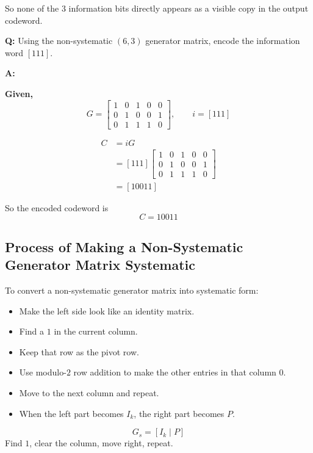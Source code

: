 \documentclass[11pt,a4paper]{book}
\newenvironment{infobox}[1][Information]{%
    \begin{tcolorbox}[
        enhanced,
        breakable,
        colback=mintgreen!10,
        colframe=mintgreen!200,
        title=#1,
        fonttitle=\bfseries,
        sharp corners,
        boxrule=0.8pt,
        left=8pt,
        right=8pt,
        top=6pt,
        bottom=6pt
    ]
}{\end{tcolorbox}}
\newcounter{qna}[chapter]
\renewcommand{\theqna}{\thechapter.\arabic{qna}}
\newenvironment{questionanswerbox}[1][Example]{%
    \refstepcounter{qna}
    \begin{tcolorbox}[
        enhanced,
        breakable,
        colback=softlavender!10,
        colframe=softlavender!200,
        title={#1~\theqna},
        fonttitle=\bfseries,
        coltitle=white,
        colbacktitle=softlavender!200,
        sharp corners,
        boxrule=1pt,
        left=8pt,
        right=8pt,
        top=6pt,
        bottom=6pt
    ]
}{\end{tcolorbox}}
\begin{document}
So none of the \(3\) information bits directly appears as a visible copy in the output codeword.

\begin{questionanswerbox}[Non-Systematic Generator Matrix Encoding Example]
\textbf{Q:} Using the non-systematic \((6,3)\) generator matrix, encode the information word \([111]\).

\textbf{A:}

\textbf{Given,}
\[
G=
\begin{bmatrix}
1&0&1&0&0\\
0&1&0&0&1\\
0&1&1&1&0
\end{bmatrix},
\qquad
i=[111]
\]

\begin{align*}
C &= iG\\
  &= [111]
\begin{bmatrix}
1&0&1&0&0\\
0&1&0&0&1\\
0&1&1&1&0
\end{bmatrix}\\
  &= [10011]
\end{align*}

So the encoded codeword is
\[
C=10011
\]
\end{questionanswerbox}

\subsection{Process of Making a Non-Systematic Generator Matrix Systematic}

\begin{infobox}[Short Process]
To convert a non-systematic generator matrix into systematic form:
\begin{itemize}
    \item Make the left side look like an identity matrix.
    \item Find a \(1\) in the current column.
    \item Keep that row as the pivot row.
    \item Use modulo-\(2\) row addition to make the other entries in that column \(0\).
    \item Move to the next column and repeat.
    \item When the left part becomes \(I_k\), the right part becomes \(P\).
\end{itemize}
\[
G_s=[I_k\mid P]
\]
Find \(1\), clear the column, move right, repeat.
\end{infobox}
\end{document}
